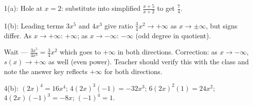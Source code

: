 \documentclass[10pt]{article}
\begin{document}
\begin{teachernote}
1(a): Hole at $x=2$: substitute into simplified $\frac{x+5}{x+2}$ to get $\frac{7}{4}$.

1(b): Leading terms $3x^5$ and $4x^3$ give ratio $\frac{3}{4}x^2 \to +\infty$ as $x\to\pm\infty$, but signs differ. As $x\to+\infty$: $+\infty$; as $x\to-\infty$: $-\infty$ (odd degree in quotient).

Wait --- $\frac{3x^5}{4x^3} = \frac{3}{4}x^2$ which goes to $+\infty$ in both directions. Correction: as $x\to-\infty$, $s(x)\to+\infty$ as well (even power). Teacher should verify this with the class and note the answer key reflects $+\infty$ for both directions.

4(b): $(2x)^4 = 16x^4$; $4(2x)^3(-1) = -32x^3$; $6(2x)^2(1)=24x^2$; $4(2x)(-1)^3=-8x$; $(-1)^4=1$.
\end{teachernote}
\end{document}
